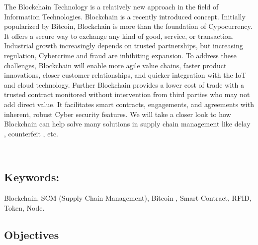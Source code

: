 \documentclass[12pt]{article}
\begin{document}
{\fontsize{14pt}{16.8pt}\selectfont The Blockchain Technology is a relatively new approach in the field of Information Technologies. Blockchain is a recently introduced concept. Initially popularized by Bitcoin, Blockchain is more than the foundation of Cypocurrency. It offers a secure way to exchange any kind of good, service, or transaction. Industrial growth increasingly depends on trusted partnerships, but increasing regulation, Cybercrime and fraud are inhibiting expansion. To address these challenges, Blockchain will enable more agile value chains, faster product innovations, closer customer relationships, and quicker integration with the IoT and cloud technology. Further Blockchain provides a lower cost of trade with a trusted contract monitored without intervention from third parties who may not add direct value. It facilitates smart contracts, engagements, and agreements with inherent, robust Cyber security features. We will take a closer look to how Blockchain can help solve many solutions in supply chain management like delay , counterfeit , etc.\par}\par

{\fontsize{16pt}{19.2pt}\selectfont   \tabto{4.77in} \par}\par

\subsection*{Keywords:}
{\fontsize{14pt}{16.8pt}\selectfont Blockchain, SCM (Supply Chain Management), Bitcoin , Smart Contract, RFID, Token, Node.\par}\par




\newpage

\vspace{\baselineskip}\begin{Center}
\section*{Objectives}
\end{Center}
\end{document}
